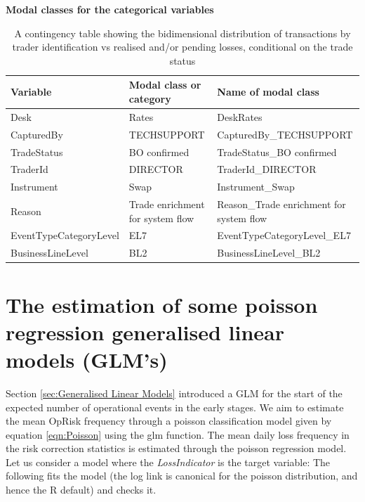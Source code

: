 \documentclass{DissertateUSU}
\begin{document}
\begin{table}[htbp]
        \centering
        \textbf{Modal classes for the categorical variables} 
\singlespacing        
        \small
        \setlength\tabcolsep{2pt}
            \begin{tabular}{|l|l|p{4cm}|} \hline
            Variable & Modal class or category & Name of modal class \\\hline
            Desk & Rates & DeskRates \\ \cline{1-3}
            CapturedBy & TECHSUPPORT & CapturedBy\_TECHSUPPORT \\ \cline{1-3}
            TradeStatus & BO confirmed & TradeStatus\_BO confirmed \\ \cline{1-3}
            TraderId & DIRECTOR & TraderId\_DIRECTOR \\ \cline{1-3}
            Instrument & Swap & Instrument\_Swap \\ \cline{1-3}
            Reason & Trade enrichment for system flow  & Reason\_Trade enrichment for system flow \\ \cline{1-3}
            EventTypeCategoryLevel & EL7 & EventTypeCategoryLevel\_EL7 \\ \cline{1-3}
            BusinessLineLevel & BL2 & BusinessLineLevel\_BL2 \\ \cline{1-3} 
            \end{tabular}
            \caption{A contingency table showing the bidimensional distribution of transactions by trader identification vs realised and/or pending losses, conditional on the trade status}
            \label{tab:Mosaic_Contingency}
\end{table}
\doublespacing

\section{The estimation of some poisson regression generalised linear models (GLM's)}
\label{sec:The estimation of some poisson regression generalised linear models (GLM's)}

Section \ref{sec:Generalised Linear Models} introduced a GLM for the
start of the expected number of operational events in the early stages.
We aim to estimate the mean OpRisk frequency through a poisson
classification model given by equation \ref{eqn:Poisson} using the glm
function. The mean daily loss frequency in the risk correction
statistics is estimated through the poisson regression model. Let us
consider a model where the \emph{LossIndicator} is the target variable:
The following fits the model (the log link is canonical for the poisson
distribution, and hence the R default) and checks it.\medskip
\end{document}

